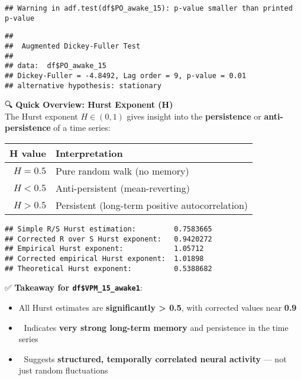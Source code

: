 \documentclass[
]{article}
\newenvironment{Shaded}{\begin{snugshade}}{\end{snugshade}}
\newcommand{\FunctionTok}[1]{\textcolor[rgb]{0.13,0.29,0.53}{\textbf{#1}}}
\newcommand{\NormalTok}[1]{#1}
\newcommand{\SpecialCharTok}[1]{\textcolor[rgb]{0.81,0.36,0.00}{\textbf{#1}}}
\providecommand{\tightlist}{%
  \setlength{\itemsep}{0pt}\setlength{\parskip}{0pt}}
\begin{document}
\begin{verbatim}
## Warning in adf.test(df$PO_awake_15): p-value smaller than printed p-value
\end{verbatim}

\begin{verbatim}
## 
##  Augmented Dickey-Fuller Test
## 
## data:  df$PO_awake_15
## Dickey-Fuller = -4.8492, Lag order = 9, p-value = 0.01
## alternative hypothesis: stationary
\end{verbatim}

🔍 \textbf{Quick Overview: Hurst Exponent (H)}\\
The Hurst exponent \(H \in (0, 1)\) gives insight into the
\textbf{persistence} or \textbf{anti-persistence} of a time series:

\begin{longtable}[]{@{}rl@{}}
\toprule\noalign{}
\textbf{H value} & \textbf{Interpretation} \\
\midrule\noalign{}
\endhead
\bottomrule\noalign{}
\endlastfoot
\(H = 0.5\) & Pure random walk (no memory) \\
\(H < 0.5\) & Anti-persistent (mean-reverting) \\
\(H > 0.5\) & Persistent (long-term positive autocorrelation) \\
\end{longtable}

\begin{Shaded}
\end{Shaded}

\begin{verbatim}
## Simple R/S Hurst estimation:         0.7583665 
## Corrected R over S Hurst exponent:   0.9420272 
## Empirical Hurst exponent:            1.05712 
## Corrected empirical Hurst exponent:  1.01898 
## Theoretical Hurst exponent:          0.5388682
\end{verbatim}

✅ \textbf{Takeaway for \texttt{df\$VPM\_15\_awake1}}:

\begin{itemize}
\tightlist
\item
  All Hurst estimates are \textbf{significantly \textgreater{} 0.5},
  with corrected values near \textbf{0.9}
\item
  🔁 Indicates \textbf{very strong long-term memory} and persistence in
  the time series
\item
  🔬 Suggests \textbf{structured, temporally correlated neural activity}
  --- not just random fluctuations
\end{itemize}
\end{document}
